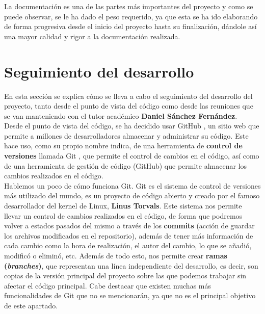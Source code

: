 La documentación es una de las partes más importantes del proyecto y como se puede observar,
se le ha dado el peso requerido, ya que esta se ha ido elaborando de forma progresiva desde
el inicio del proyecto hasta su finalización, dándole así una mayor calidad y rigor a la
documentación realizada.

\section{Seguimiento del desarrollo} \label{sec:tracking}
En esta sección se explica cómo se lleva a cabo el seguimiento del desarrollo del proyecto,
tanto desde el punto de vista del código como desde las reuniones que se van manteniendo
con el tutor académico \textbf{Daniel Sánchez Fernández}.\\

Desde el punto de vista del código, se ha decidido usar GitHub \cite{github}, un sitio web
que permite a millones de desarrolladores almacenar y administrar su código. Este hace uso,
como su propio nombre indica, de una herramienta de \textbf{control de versiones} llamada
Git \cite{git}, que permite el control de cambios en el código, así como de una herramienta
de gestión de código (GitHub) que permite almacenar los cambios realizados en el código.\\

Hablemos un poco de cómo funciona Git. Git es el sistema de control de versiones más
utilizado del mundo, es un proyecto de código abierto y creado por el famoso desarrollador
del kernel de Linux, \textbf{Linus Torvals}. Este sistema nos permite llevar un control de
cambios realizados en el código, de forma que podremos volver a estados pasados del mismo
a través de los \textbf{commits} (acción de guardar los archivos modificados en el
repositorio), además de tener más información de cada cambio como la hora de realización,
el autor del cambio, lo que se añadió, modificó o eliminó, etc. Además de todo esto, nos
permite crear \textbf{ramas (\textit{branches})}, que representan una línea independiente del
desarrollo, es decir, son copias de la versión principal del proyecto sobre las que podemos
trabajar sin afectar el código principal. Cabe destacar que existen muchas más
funcionalidades de Git que no se mencionarán, ya que no es el principal objetivo de este
apartado.\\

